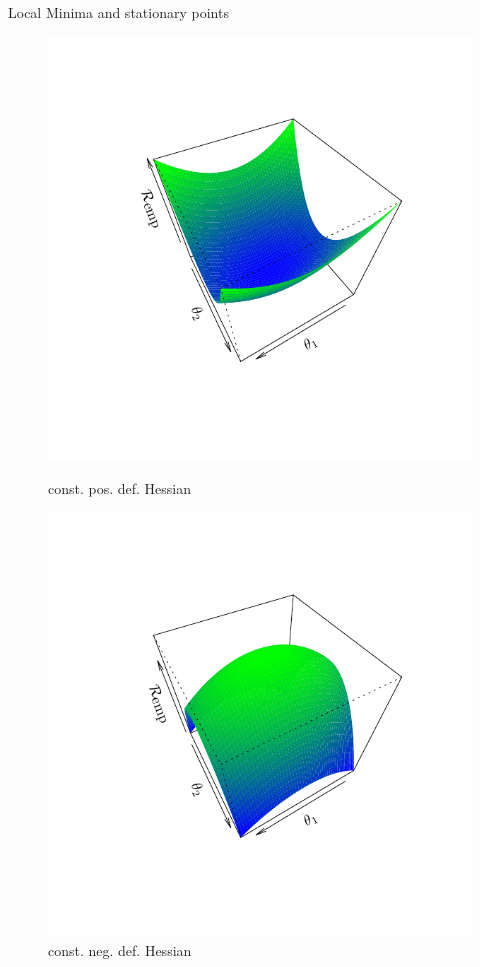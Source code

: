 \documentclass[11pt,compress,t,notes=noshow, xcolor=table]{beamer}
\begin{document}
\begin{vbframe}{Local Minima and stationary points}
\begin{figure}[!htb]
  \includegraphics[trim=2.2cm 2.2cm 2.2cm 2.2cm, width=\linewidth]{figure/hess1}
  \caption*{\footnotesize const. pos. def. Hessian}
\endminipage\hfill
{}%
  \includegraphics[trim=2.2cm 2.2cm 2.2cm 2.2cm, width=\linewidth]{figure/hess2}
  \caption*{\footnotesize const. neg. def. Hessian}
\endminipage
\end{figure}

\end{vbframe}
\end{document}
